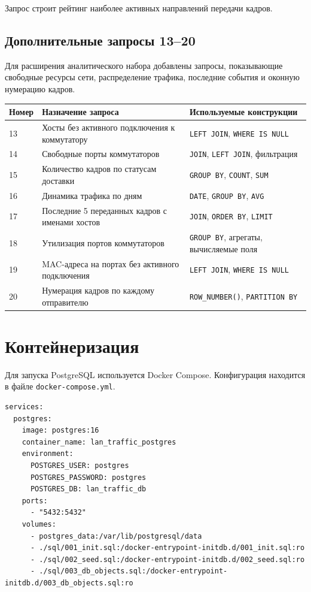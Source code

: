 \documentclass[12pt,a4paper]{article}
\begin{document}
Запрос строит рейтинг наиболее активных направлений передачи кадров.

\subsection{Дополнительные запросы 13--20}

Для расширения аналитического набора добавлены запросы, показывающие свободные ресурсы сети, распределение трафика, последние события и оконную нумерацию кадров.

\begin{longtable}{|p{1.3cm}|p{7cm}|p{6cm}|}
\hline
\textbf{Номер} & \textbf{Назначение запроса} & \textbf{Используемые конструкции}\\
\hline
13 & Хосты без активного подключения к коммутатору & \texttt{LEFT JOIN}, \texttt{WHERE IS NULL}\\
\hline
14 & Свободные порты коммутаторов & \texttt{JOIN}, \texttt{LEFT JOIN}, фильтрация\\
\hline
15 & Количество кадров по статусам доставки & \texttt{GROUP BY}, \texttt{COUNT}, \texttt{SUM}\\
\hline
16 & Динамика трафика по дням & \texttt{DATE}, \texttt{GROUP BY}, \texttt{AVG}\\
\hline
17 & Последние 5 переданных кадров с именами хостов & \texttt{JOIN}, \texttt{ORDER BY}, \texttt{LIMIT}\\
\hline
18 & Утилизация портов коммутаторов & \texttt{GROUP BY}, агрегаты, вычисляемые поля\\
\hline
19 & MAC-адреса на портах без активного подключения & \texttt{LEFT JOIN}, \texttt{WHERE IS NULL}\\
\hline
20 & Нумерация кадров по каждому отправителю & \texttt{ROW\_NUMBER()}, \texttt{PARTITION BY}\\
\hline
\end{longtable}

\section{Контейнеризация}

Для запуска PostgreSQL используется Docker Compose. Конфигурация находится в файле \texttt{docker-compose.yml}.

\begin{lstlisting}[caption={Фрагмент docker-compose.yml}]
services:
  postgres:
    image: postgres:16
    container_name: lan_traffic_postgres
    environment:
      POSTGRES_USER: postgres
      POSTGRES_PASSWORD: postgres
      POSTGRES_DB: lan_traffic_db
    ports:
      - "5432:5432"
    volumes:
      - postgres_data:/var/lib/postgresql/data
      - ./sql/001_init.sql:/docker-entrypoint-initdb.d/001_init.sql:ro
      - ./sql/002_seed.sql:/docker-entrypoint-initdb.d/002_seed.sql:ro
      - ./sql/003_db_objects.sql:/docker-entrypoint-initdb.d/003_db_objects.sql:ro
\end{lstlisting}
\end{document}
